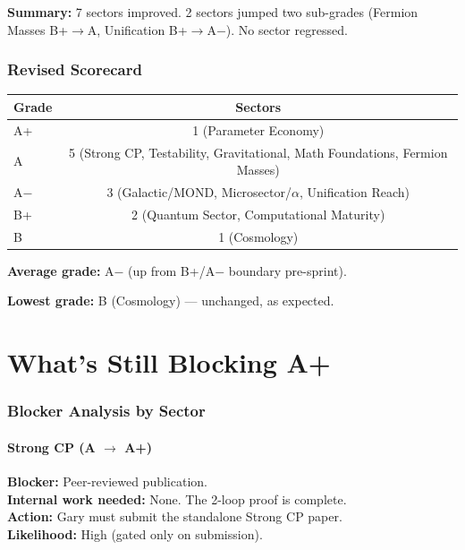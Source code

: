 \documentclass[11pt,a4paper]{article}
\begin{document}
\textbf{Summary:} 7 sectors improved. 2 sectors jumped two sub-grades
(Fermion Masses B+$\to$A, Unification B+$\to$A$-$). No sector regressed.

\section{Revised Scorecard}

\begin{center}
\begin{tabular}{lc}
\toprule
\textbf{Grade} & \textbf{Sectors} \\
\midrule
A+ & 1 (Parameter Economy) \\
A & 5 (Strong CP, Testability, Gravitational, Math Foundations, Fermion Masses) \\
A$-$ & 3 (Galactic/MOND, Microsector/$\alpha$, Unification Reach) \\
B+ & 2 (Quantum Sector, Computational Maturity) \\
B & 1 (Cosmology) \\
\bottomrule
\end{tabular}
\end{center}

\textbf{Average grade:} A$-$ (up from B+/A$-$ boundary pre-sprint).

\textbf{Lowest grade:} B (Cosmology) --- unchanged, as expected.


\newpage
\part{What's Still Blocking A+}
\label{part:blockers}

\section{Blocker Analysis by Sector}

\subsection{Strong CP (A $\to$ A+)}
\textbf{Blocker:} Peer-reviewed publication.\\
\textbf{Internal work needed:} None. The 2-loop proof is complete.\\
\textbf{Action:} Gary must submit the standalone Strong CP paper.\\
\textbf{Likelihood:} \textcolor{gradeA}{High} (gated only on submission).
\end{document}
